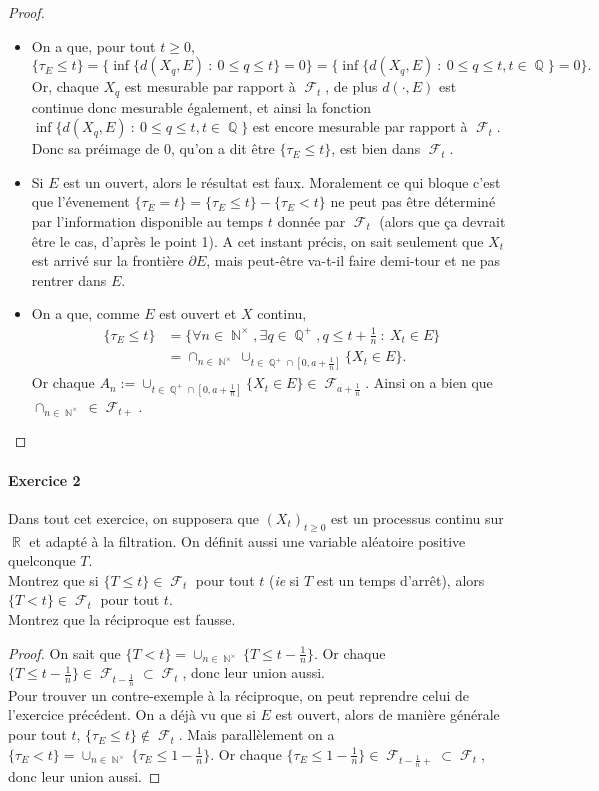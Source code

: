 \documentclass{article}
\theoremstyle{definition}
\numberwithin{equation}{section}
\DeclareMathOperator{\R}{\mathbb{R}}
\DeclareMathOperator{\Q}{\mathbb{Q}}
\DeclareMathOperator{\N}{\mathbb{N}}
\DeclareMathOperator{\Ff}{\mathcal{F}}
\begin{document}
\begin{proof}~
\begin{itemize} 
    \item[$\bullet$] On a que, pour tout $t\geq 0$,
    $$ \{\tau_E \leq t\} = \{\inf\{d(X_q,E)~:~0\leq q\leq t\}=0\} = \{\inf\{d(X_q,E)~:~0\leq q\leq t, t\in\Q\}=0\}. $$
    Or, chaque $X_q$ est mesurable par rapport à $\Ff_t$, de plus $d(\cdot,E)$ est continue donc mesurable également, et ainsi la fonction $\inf\{d(X_q,E)~:~0\leq q\leq t, t\in\Q\}$ est encore mesurable par rapport à $\Ff_t$. Donc sa préimage de 0, qu'on a dit être $\{\tau_E\leq t\}$, est bien dans $\Ff_t$.
    \item[$\bullet$] Si $E$ est un ouvert, alors le résultat est faux. Moralement ce qui bloque c'est que l'évenement $\{\tau_E=t\}=\{\tau_E\leq t\}-\{\tau_E<t\}$ ne peut pas être déterminé par l'information disponible au temps $t$ donnée par $\Ff_t$ (alors que ça devrait être le cas, d'après le point 1). A cet instant précis, on sait seulement que $X_t$ est arrivé sur la frontière $\partial E$, mais peut-être va-t-il faire demi-tour et ne pas rentrer dans $E$.
    \item[$\bullet$] On a que, comme $E$ est ouvert et $X$ continu,
    \begin{align*}
        \{\tau_E \leq t\} &= \{\forall n\in\N^\times, \exists q\in \Q^+, q\leq t+\frac{1}{n}~:~X_t\in E\}\\
        &= \cap_{n\in\N^\times}\cup_{t\in\Q^+\cap[0,a+\frac{1}{n}]}\{X_t\in E\}.
    \end{align*}
    Or chaque $A_n:=\cup_{t\in\Q^+\cap[0,a+\frac{1}{n}]}\{X_t\in E\} \in \Ff_{a+\frac{1}{n}}$. Ainsi on a bien que $\cap_{n\in\N^\times}\in\Ff_{t+}$.
\end{itemize}
\end{proof}


\paragraph{Exercice 2}
Dans tout cet exercice, on supposera que $(X_t)_{t\geq 0}$ est un processus continu sur $\R$ et adapté à la filtration. On définit aussi une variable aléatoire positive quelconque $T$.\\
Montrez que si $\{T\leq t\}\in\Ff_t$ pour tout $t$ (\textit{ie} si $T$ est un temps d'arrêt), alors $\{T<t\}\in\Ff_t$ pour tout $t$.\\
Montrez que la réciproque est fausse.

\begin{proof}
On sait que $\{T<t\}=\cup_{n\in\N^\times}\{T\leq t-\frac{1}{n}\}$. Or chaque $\{T\leq t-\frac{1}{n}\}\in\Ff_{t-\frac{1}{n}}\subset \Ff_t$, donc leur union aussi.\\
Pour trouver un contre-exemple à la réciproque, on peut reprendre celui de l'exercice précédent. On a déjà vu que si $E$ est ouvert, alors de manière générale pour tout $t$, $\{\tau_E\leq t\}\notin \Ff_t$. Mais parallèlement on a $\{\tau_E<t\}=\cup_{n\in\N^\times}\{\tau_E\leq 1-\frac{1}{n}\}$. Or chaque $\{\tau_E\leq 1-\frac{1}{n}\}\in\Ff_{t-\frac{1}{n}+}\subset \Ff_t$, donc leur union aussi.
\end{proof}
\end{document}
